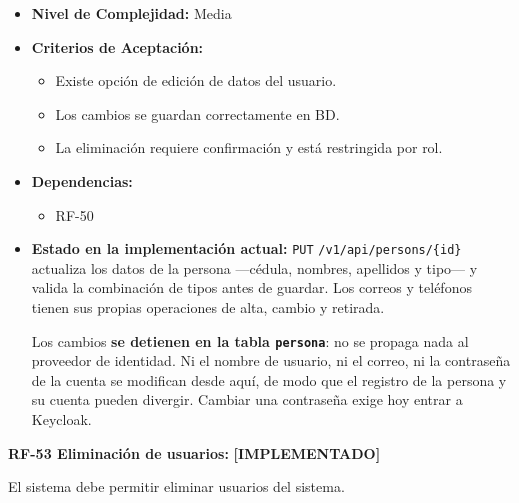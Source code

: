 \documentclass[12pt,a4paper]{article}
\newcommand{\ruta}[1]{\nolinkurl{#1}}
\newcommand{\estadoImplementado}{\textcolor{mainRed}{\textbf{[IMPLEMENTADO]}}}
\begin{document}
\begin{itemize}
  \item \textbf{Nivel de Complejidad:} Media

  \item \textbf{Criterios de Aceptación:}
  \begin{itemize}
    \item Existe opción de edición de datos del usuario.
    \item Los cambios se guardan correctamente en BD.
    \item La eliminación requiere confirmación y está restringida por rol.
  \end{itemize}

  \item \textbf{Dependencias:}
  \begin{itemize}
    \item RF-50
  \end{itemize}

  \item \textbf{Estado en la implementación actual:} \texttt{PUT} \ruta{/v1/api/persons/{id}} actualiza los datos de la persona —cédula, nombres, apellidos y tipo— y valida la combinación de tipos antes de guardar. Los correos y teléfonos tienen sus propias operaciones de alta, cambio y retirada.

  Los cambios \textbf{se detienen en la tabla \texttt{persona}}: no se propaga nada al proveedor de identidad. Ni el nombre de usuario, ni el correo, ni la contraseña de la cuenta se modifican desde aquí, de modo que el registro de la persona y su cuenta pueden divergir. Cambiar una contraseña exige hoy entrar a Keycloak.
\end{itemize}

\textbf{RF-53 Eliminación de usuarios:} \estadoImplementado{}

El sistema debe permitir eliminar usuarios del sistema.
\end{document}
